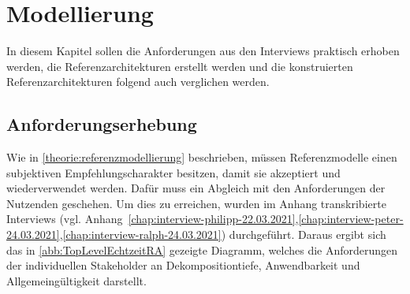 \chapter{Modellierung}
In diesem Kapitel sollen die Anforderungen aus den Interviews praktisch erhoben werden, die Referenzarchitekturen erstellt werden und die konstruierten Referenzarchitekturen folgend auch verglichen werden.
\section{Anforderungserhebung}
Wie in \autoref{theorie:referenzmodellierung} beschrieben, müssen Referenzmodelle einen subjektiven Empfehlungscharakter besitzen, damit sie akzeptiert und wiederverwendet werden. Dafür muss ein Abgleich mit den Anforderungen der Nutzenden geschehen. Um dies zu erreichen, wurden im Anhang transkribierte Interviews (vgl. Anhang~\ref{chap:interview-philipp-22.03.2021},\ref{chap:interview-peter-24.03.2021},\ref{chap:interview-ralph-24.03.2021}) durchgeführt. Daraus ergibt sich das in \autoref{abb:TopLevelEchtzeitRA} gezeigte Diagramm, welches die Anforderungen der individuellen Stakeholder an Dekompositiontiefe, Anwendbarkeit und Allgemeingültigkeit darstellt.

